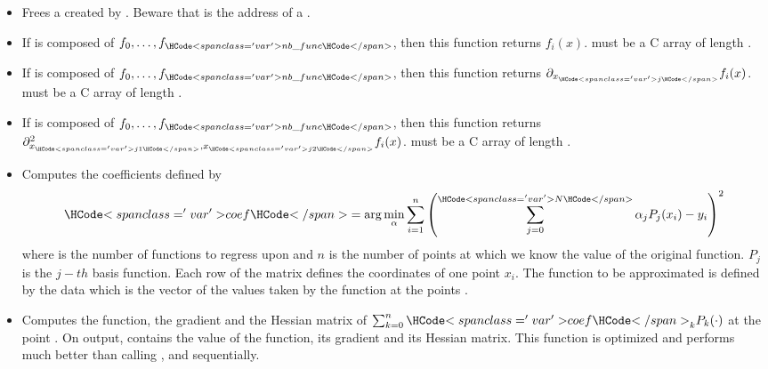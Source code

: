 \begin{itemize}
\item  {}
  \sshortdescribe Frees a  created by
  . Beware that  is the address of a
  \ptr.

\item  {}
  \sshortdescribe If  is composed of $f_0, \dots, f_{\var{nb\_func}}$,
  then this function returns $f_i(x)$.  must be a C array of length
  .

\item {}
  \sshortdescribe If  is composed of $f_0, \dots, f_{\var{nb\_func}}$,
  then this function returns $\partial_{x_{\var{j}}} f_i(x)$.  must be a C array
  of length .

  
\item {}
  \sshortdescribe If  is composed of $f_0, \dots, f_{\var{nb\_func}}$,
  then this function returns $\partial^2_{x_{\var{j1}}, x_{\var{j2}}}
  f_i(x)$.  must be a C array of length .


\item {}
  \sshortdescribe Computes the coefficients  defined by
  \begin{equation*}
    \var{coef} = \arg\min_\alpha \sum_{i=1}^n
    \left( \sum_{j=0}^{\var{N}} \alpha_j  P_j(x_i) - y_i\right)^2
  \end{equation*}
  where  is the number of functions to regress upon and $n$ is the
  number of points at which we know the value of the original function. $P_j$
  is the $j-th$ basis function. Each row of the matrix  defines the
  coordinates of one point $x_i$. The function to be approximated is defined
  by the data  which is the vector of the values taken by the function
  at the points .

\item {}
  \sshortdescribe Computes the function, the gradient and the Hessian matrix
  of $\sum_{k=0}^n \var{coef}_k  P_k(\cdot)$ at the point .
  On output,  contains the value of the function,  its
  gradient and  its Hessian matrix. This function is optimized and
  performs much better than calling ,
   and  sequentially.


\end{itemize}
